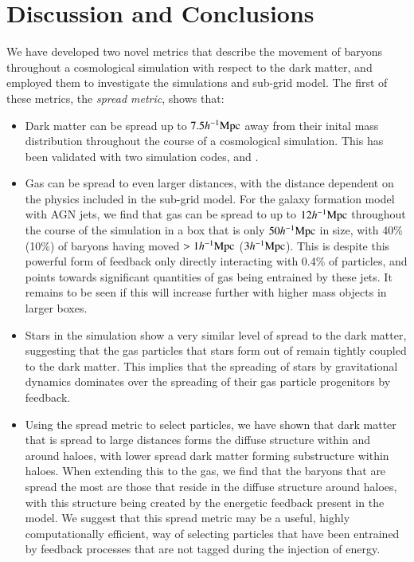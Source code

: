 \section{Discussion and Conclusions}
\label{sec:conclusions}

We have developed two novel metrics that describe the movement of baryons
throughout a cosmological simulation with respect to the dark matter, and
employed them to investigate the \simba{} simulations and sub-grid model.
The first of these metrics, the {\it spread metric}, shows that:
\begin{itemize}
    \item Dark matter can be spread up to $7.5h^{-1}{\rm Mpc}{}$ away from their inital
          mass distribution throughout the course of a cosmological simulation.
          This has been validated with two simulation codes, \gizmo{} and \swift{}.
    \item Gas can be spread to even larger distances, with the distance
          dependent on the physics included in the sub-grid model. For the
          \simba{} galaxy formation model with AGN jets, we find that gas can
          be spread to up to $12h^{-1}{\rm Mpc}{}$ throughout the course of the
          simulation in a box that is only $50h^{-1}{\rm Mpc}{}$ in size, with 40\%
          (10\%) of baryons having moved $> 1h^{-1}{\rm Mpc}{}$ ($3h^{-1}{\rm Mpc}{}$). This is
          despite this powerful form of feedback only directly interacting
          with 0.4\% of particles, and points towards significant quantities
          of gas being entrained by these jets. It remains to be seen if this
          will increase further with higher mass objects in larger boxes.
    \item Stars in the simulation show a very similar level of spread to the
          dark matter, suggesting that the gas particles that stars form out
          of remain tightly coupled to the dark matter. This implies that the
          spreading of stars by gravitational dynamics dominates over the
          spreading of their gas particle progenitors by feedback.
    \item Using the spread metric to select particles, we have shown that
          dark matter that is spread to large distances forms the diffuse
          structure within and around haloes, with lower spread dark matter
          forming substructure within haloes. When extending this to the gas,
          we find that the baryons that are spread the most are those that
          reside in the diffuse structure around haloes, with this structure
          being created by the energetic feedback present in the \simba{}
          model. We suggest that this spread metric may be a useful, highly
          computationally efficient, way of selecting particles that have been
          entrained by feedback processes that are not tagged during the
          injection of energy.
\end{itemize}
